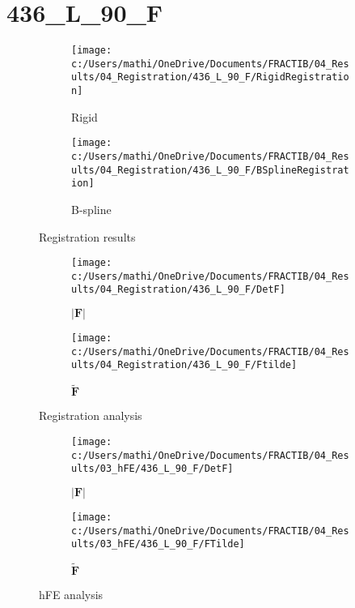 \documentclass{article}%
\begin{document}
%
\newpage%
\section*{436\_L\_90\_F}%
\label{sec:436L90F}%


\begin{figure}[h!]%
\begin{subfigure}[b]{0.5\linewidth}%
\texttt{[image: c:/Users/mathi/OneDrive/Documents/FRACTIB/04\_Results/04\_Registration/436\_L\_90\_F/RigidRegistration]}%
\caption{Rigid}%
\end{subfigure}%
\begin{subfigure}[b]{0.5\linewidth}%
\texttt{[image: c:/Users/mathi/OneDrive/Documents/FRACTIB/04\_Results/04\_Registration/436\_L\_90\_F/BSplineRegistration]}%
\caption{B{-}spline}%
\end{subfigure}%
\caption{Registration results}%
\end{figure}

%


\begin{figure}[h!]%
\begin{subfigure}[b]{0.5\linewidth}%
\texttt{[image: c:/Users/mathi/OneDrive/Documents/FRACTIB/04\_Results/04\_Registration/436\_L\_90\_F/DetF]}%
\caption{$|\mathbf{F}|$}%
\end{subfigure}%
\begin{subfigure}[b]{0.5\linewidth}%
\texttt{[image: c:/Users/mathi/OneDrive/Documents/FRACTIB/04\_Results/04\_Registration/436\_L\_90\_F/Ftilde]}%
\caption{$\tilde{\mathbf{F}}$}%
\end{subfigure}%
\caption{Registration analysis}%
\end{figure}

%


\begin{figure}[h!]%
\begin{subfigure}[b]{0.5\linewidth}%
\texttt{[image: c:/Users/mathi/OneDrive/Documents/FRACTIB/04\_Results/03\_hFE/436\_L\_90\_F/DetF]}%
\caption{$|\mathbf{F}|$}%
\end{subfigure}%
\begin{subfigure}[b]{0.5\linewidth}%
\texttt{[image: c:/Users/mathi/OneDrive/Documents/FRACTIB/04\_Results/03\_hFE/436\_L\_90\_F/FTilde]}%
\caption{$\tilde{\mathbf{F}}$}%
\end{subfigure}%
\caption{hFE analysis}%
\end{figure}
\end{document}

